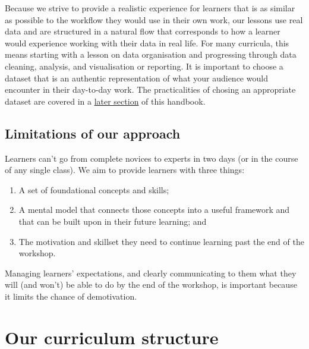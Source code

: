 \documentclass[]{book}
\providecommand{\tightlist}{%
  \setlength{\itemsep}{0pt}\setlength{\parskip}{0pt}}
\begin{document}
Because we strive to provide a realistic experience for learners
that is as similar as possible to the workflow they would use
in their own work, our lessons use real data and are structured
in a natural flow that corresponds to how a learner would experience
working with their data in real life. For many curricula, this
means starting with a lesson on data organisation and progressing
through data cleaning, analysis, and visualisation or reporting.
It is important to choose a dataset that is an authentic
representation of what your audience would encounter in their
day-to-day work. The practicalities of chosing an appropriate
dataset are covered in a \protect\hyperlink{picking-a-dataset}{later section}
of this handbook.

\hypertarget{limitations-of-our-approach}{%
\section{Limitations of our approach}\label{limitations-of-our-approach}}

Learners can't go from complete novices to experts in two days (or
in the course of any single class). We aim to provide learners with
three things:

\begin{enumerate}
\def\labelenumi{\arabic{enumi}.}
\tightlist
\item
  A set of foundational concepts and skills;
\item
  A mental model that connects those concepts into a useful
  framework and that can be built upon in their future learning; and
\item
  The motivation and skillset they need to continue learning
  past the end of the workshop.
\end{enumerate}

Managing learners' expectations, and clearly communicating to
them what they will (and won't) be able to do by the end of the
workshop, is important because it limits the chance of demotivation.

\hypertarget{our-curriculum-structure}{%
\chapter{Our curriculum structure}\label{our-curriculum-structure}}
\end{document}
